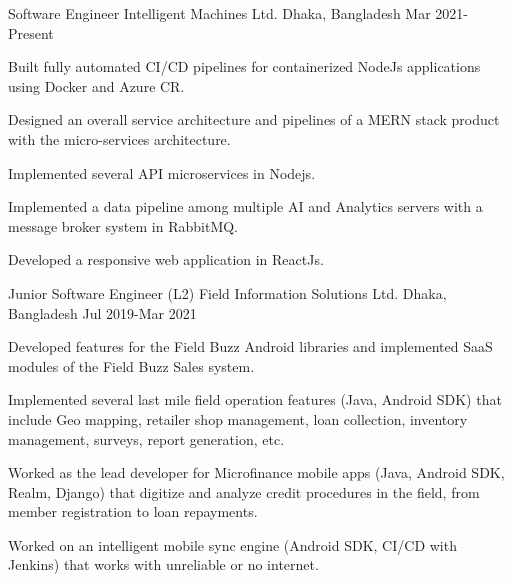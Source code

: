 

\begin{cventries}

  \cventry
    {Software Engineer} %
    {Intelligent Machines Ltd.} %
    {Dhaka, Bangladesh} %
    {Mar 2021-Present} %
    {
      \begin{cvitems} %
        \item {Built fully automated CI/CD pipelines for containerized NodeJs applications using Docker and Azure CR.}
        \item {Designed an overall service architecture and pipelines of a MERN stack product with the micro-services architecture.}
        \item {Implemented several API microservices in Nodejs.}
        \item {Implemented a data pipeline among multiple AI and Analytics servers with a message broker system in RabbitMQ.}
        \item {Developed a responsive web application in ReactJs.}
      \end{cvitems}
    }

  \cventry
    {Junior Software Engineer (L2)} %
    {Field Information Solutions Ltd.} %
    {Dhaka, Bangladesh} %
    {Jul 2019-Mar 2021} %
    {
      \begin{cvitems} %
        \item {Developed features for the Field Buzz Android libraries and implemented SaaS modules of the Field Buzz Sales system.}
        \item {Implemented several last mile field operation features (Java, Android SDK) that include Geo mapping, retailer shop management, loan collection, inventory management, surveys, report generation, etc.}
        \item {Worked as the lead developer for Microfinance mobile apps (Java, Android SDK, Realm, Django) that digitize and analyze credit procedures in the field, from member registration to loan repayments.}
        \item {Worked on an intelligent mobile sync engine (Android SDK, CI/CD with Jenkins) that works with unreliable or no internet.}
      \end{cvitems}
    }


\end{cventries}
